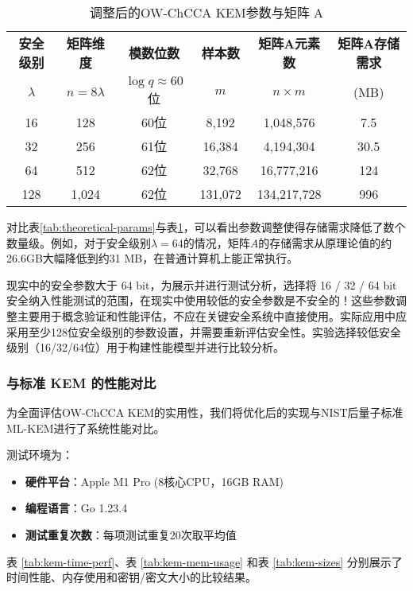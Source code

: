 \begin{table}[ht]
  \centering
  \caption{调整后的OW-ChCCA KEM参数与矩阵 A}
  \label{tab:practical-params}
  \begin{tabular}{|c|c|c|c|c|c|}
  \hline
  \textbf{安全级别} & \textbf{矩阵维度} & \textbf{模数位数} & \textbf{样本数} & \textbf{矩阵A元素数} & \textbf{矩阵A存储需求} \\
  $\lambda$ & $n = 8\lambda$ & $\log q \approx 60$位 & $m$ & $n \times m$ & (MB) \\
  \hline
  16 & 128 & 60位 & 8,192 & 1,048,576 & 7.5  \\
  \hline
  32 & 256 & 61位 & 16,384 & 4,194,304 & 30.5 \\
  \hline
  64 & 512 & 62位 & 32,768 & 16,777,216 & 124 \\
  \hline
  128 & 1,024 & 62位 & 131,072 & 134,217,728 & 996 \\
  \hline
  \end{tabular}
\end{table}

对比表\ref{tab:theoretical-params}与表\ref{tab:practical-params}，可以看出参数调整使得存储需求降低了数个数量级。例如，对于安全级别$\lambda=64$的情况，矩阵$A$的存储需求从原理论值的约26.6GB大幅降低到约31 MB，在普通计算机上能正常执行。

现实中的安全参数大于 64 bit，为展示并进行测试分析，选择将 16 / 32 / 64 bit安全纳入性能测试的范围，在现实中使用较低的安全参数是不安全的！这些参数调整主要用于概念验证和性能评估，不应在关键安全系统中直接使用。实际应用中应采用至少128位安全级别的参数设置，并需要重新评估安全性。实验选择较低安全级别（16/32/64位）用于构建性能模型并进行比较分析。

\subsubsection{与标准 KEM 的性能对比}
\label{subsec:comp-mlkem}
为全面评估OW-ChCCA KEM的实用性，我们将优化后的实现与NIST后量子标准ML-KEM进行了系统性能对比。

测试环境为：
\begin{itemize}
  \item \textbf{硬件平台}：Apple M1 Pro (8核心CPU，16GB RAM)
  \item \textbf{编程语言}：Go 1.23.4
  \item \textbf{测试重复次数}：每项测试重复20次取平均值
\end{itemize}

表 \ref{tab:kem-time-perf}、表 \ref{tab:kem-mem-usage} 和表 \ref{tab:kem-sizes} 分别展示了时间性能、内存使用和密钥/密文大小的比较结果。


